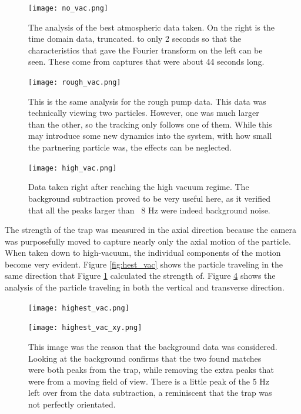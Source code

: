 \documentclass[12pt]{article}
\begin{document}
\begin{figure}
\texttt{[image: no\_vac.png]}\
\caption{The analysis of the best atmospheric data taken. On the right is the time domain data, truncated. to only 2 seconds so that the characteristics that gave the Fourier transform on the left can be seen. These come from captures that were about 44 seconds long. }
\label{fig:no_vac}
\end{figure}

\begin{figure}
\texttt{[image: rough\_vac.png]}\
\caption{This is the same analysis for the rough pump data. This data was technically viewing two particles. However, one was much larger than the other, so the tracking only follows one of them. While this may introduce some new dynamics into the system, with how small the partnering particle was, the effects can be neglected.}
\label{fig:rough_vac}
\end{figure}

\begin{figure}
\texttt{[image: high\_vac.png]}\
\caption{Data taken right after reaching the high vacuum regime. The background subtraction proved to be very useful here, as it verified that all the peaks larger than ~8 Hz were indeed background noise.}
\label{fig:h_vac}
\end{figure}

The strength of the trap was measured in the axial direction because the camera was purposefully moved to capture nearly only the axial motion of the particle. When taken down to high-vacuum, the individual components of the motion become very evident. Figure \ref{fig:hest_vac} shows the particle traveling in the same direction that Figure \ref{fig:no_vac} calculated the strength of. Figure \ref{fig:hest_vac_xy} shows the analysis of the particle traveling in both the vertical and transverse direction. 

\begin{figure}
\texttt{[image: highest\_vac.png]}\
\caption{This is data that was taken 1 hour after the high vacuum regime was first reached. Comparing this one with Figure \ref{fig:h_vac}, the extra peak left over after background subtraction has disappeared, and the peak left over is tighter than before.}
\label{fig:hest_vac}

\texttt{[image: highest\_vac\_xy.png]}\
\caption{This image was the reason that the background data was considered. Looking at the background confirms that the two found matches were both peaks from the trap, while removing the extra peaks that were from a moving field of view. There is a little peak of the 5 Hz left over from the data subtraction, a reminiscent that the trap was not perfectly orientated.}
\label{fig:hest_vac_xy}
\end{figure}
\end{document}
